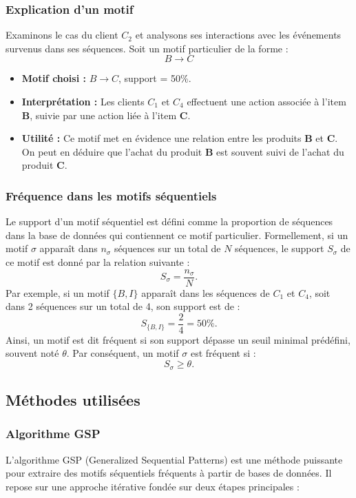\documentclass[a4paper,12pt]{article}
\begin{document}
\subsubsection*{Explication d'un motif}
Examinons le cas du client $C_2$ et analysons ses interactions avec les événements survenus dans ses séquences. Soit un motif particulier de la forme :
\[
B \rightarrow C 
\]
\begin{itemize}
    \item \textbf{Motif choisi :} $B \rightarrow C$, support = 50\%.
    \item \textbf{Interprétation :} Les clients $C_1$ et $C_4$ effectuent une action associée à l'item \textbf{B}, suivie par une action liée à l'item \textbf{C}.
    \item \textbf{Utilité :} Ce motif met en évidence une relation entre les produits \textbf{B} et \textbf{C}. On peut en déduire que l'achat du produit \textbf{B} est souvent suivi de l'achat du produit \textbf{C}.
\end{itemize}

\subsubsection{Fréquence dans les motifs séquentiels}
Le support d'un motif séquentiel est défini comme la proportion de séquences dans la base de données qui contiennent ce motif particulier. Formellement, si un motif $\sigma$ apparaît dans $n_{\sigma}$ séquences sur un total de $N$ séquences, le support $S_{\sigma}$ de ce motif est donné par la relation suivante :
\[
S_{\sigma} = \frac{n_{\sigma}}{N}.
\]
Par exemple, si un motif $\{B, I\}$ apparaît dans les séquences de $C_1$ et $C_4$, soit dans 2 séquences sur un total de 4, son support est de :
\[
S_{\{B, I\}} = \frac{2}{4} = 50\%.
\]
Ainsi, un motif est dit fréquent si son support dépasse un seuil minimal prédéfini, souvent noté $\theta$. Par conséquent, un motif $\sigma$ est fréquent si :
\[
S_{\sigma} \geq \theta.
\] 
\newpage
\subsection{Méthodes utilisées}

\subsubsection{Algorithme GSP}
\label{sec:GSP}
L'algorithme GSP (Generalized Sequential Patterns) est une méthode puissante pour extraire des motifs séquentiels fréquents à partir de bases de données. Il repose sur une approche itérative fondée sur deux étapes principales :
\end{document}
